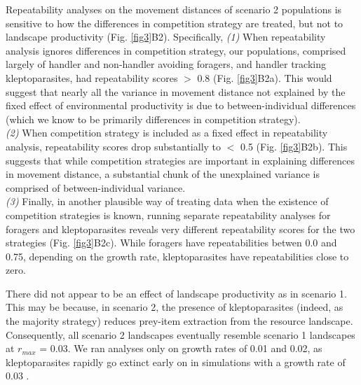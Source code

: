     Repeatability analyses on the movement distances of scenario 2 populations is sensitive to how the differences in competition strategy are treated, but not to landscape productivity (Fig. \ref{fig3}B2). Specifically,
    \textit{(1)} When repeatability analysis ignores differences in competition strategy, our populations, comprised largely of handler and non-handler avoiding foragers, and handler tracking kleptoparasites, had repeatability scores $>$ 0.8 (Fig. \ref{fig3}B2a).
    This would suggest that nearly all the variance in movement distance not explained by the fixed effect of environmental productivity is due to between-individual differences (which we know to be primarily differences in competition strategy).\\
    \textit{(2)} When competition strategy is included as a fixed effect in repeatability analysis, repeatability scores drop substantially to $<$ 0.5 (Fig. \ref{fig3}B2b).
    This suggests that while competition strategies are important in explaining differences in movement distance, a substantial chunk of the unexplained variance is comprised of between-individual variance.\\ 
    \textit{(3)} Finally, in another plausible way of treating data when the existence of competition strategies is known, running separate repeatability analyses for foragers and kleptoparasites reveals very different repeatability scores for the two strategies (Fig. \ref{fig3}B2c).
    While foragers have repeatabilities betwen 0.0 and 0.75, depending on the growth rate, kleptoparasites have repeatabilities close to zero.
    
    There did not appear to be an effect of landscape productivity as in scenario 1.
    This may be because, in scenario 2, the presence of kleptoparasites (indeed, as the majority strategy) reduces prey-item extraction from the resource landscape.
    Consequently, all scenario 2 landscapes eventually resemble scenario 1 landscapes at $r_{max}$ = 0.03.
    We ran analyses only on growth rates of 0.01 and 0.02, as kleptoparasites rapidly go extinct early on in simulations with a growth rate of 0.03 \citep[see][for an explanation of the evolutionary dynamics]{gupte2021a}.
    
